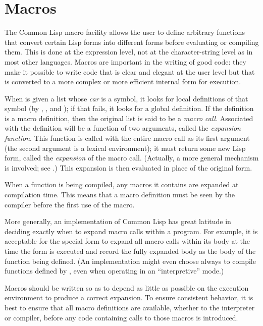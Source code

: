 
\clearpage\def\pagestatus{ULTIMATE}

\chapter{Macros}
\label{MACROS}


The Common Lisp macro facility allows the user to define arbitrary
functions that convert certain Lisp forms into different forms before
evaluating or compiling them.  This is done at the expression level,
not at the character-string level as in most other languages.  Macros
are important in the writing of good code: they make it possible to
write code that is clear and elegant at the user level but that is
converted to a more complex or more efficient internal form for
execution.

When  is given a list whose {\it car} is a symbol, it looks
for local definitions of that symbol (by , ,
and ); if that fails, it looks for a global definition.
If the definition is a macro definition, then the original
list is said to be a {\it macro call}.  Associated with the definition
will be a function of two arguments, called the {\it expansion function}.
This function is called with the entire macro call as its first argument
(the second argument is a lexical environment);
it must return some new Lisp form, called the {\it expansion} of the
macro call.  (Actually, a more general mechanism is involved;
see .)
This expansion is then evaluated in place of the original
form.

When a function is being compiled, any macros it contains are expanded
at compilation time.  This means that a macro definition must be seen by the
compiler before the first use of the macro.

More generally, an implementation of Common Lisp has great latitude in deciding
exactly when to expand macro calls within a program.  For example,
it is acceptable for the  special form to expand all macro
calls within its body at the time the  form is executed
and record the fully expanded body as the body of the function
being defined.
(An implementation might even choose always to compile functions defined
by , even when operating in an ``interpretive'' mode.)

Macros should be written so as to depend as little as possible
on the execution environment to produce a correct expansion.  To ensure
consistent behavior, it is best to ensure that all macro definitions are
available, whether to the interpreter or compiler, before any code
containing calls to those macros is introduced.


